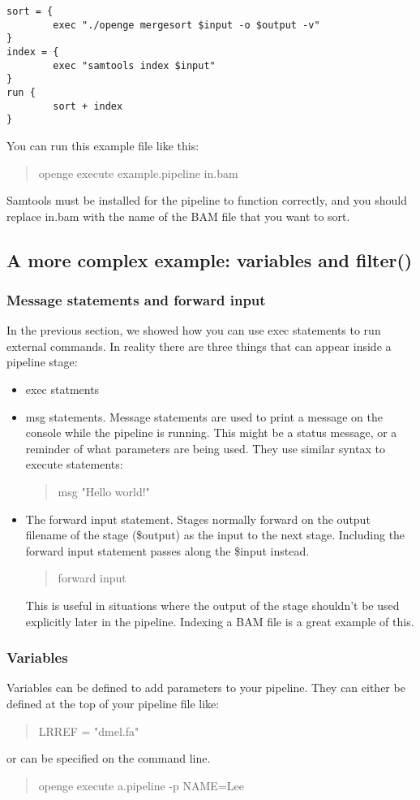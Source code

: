 \documentclass[11pt]{article}
\newcommand {\cmd}[1] {\begin{quote}#1\end{quote}}
\begin{document}
\begin{verbatim}
sort = {
        exec "./openge mergesort $input -o $output -v"
}
index = {
        exec "samtools index $input"
}
run {
        sort + index
}
\end{verbatim}

You can run this example file like this:

\cmd{openge execute example.pipeline in.bam}

Samtools must be installed for the pipeline to function correctly, and you should replace in.bam with the name of the BAM file that you want to sort.

\subsection {A more complex example: variables and filter()}

\subsubsection{Message statements and forward input}
In the previous section, we showed how you can use exec statements to run external commands. In reality there are three things that can appear inside a pipeline stage:
\begin{itemize}
\item exec statments
\item msg statements. Message statements are used to print a message on the console while the pipeline is running. This might be a status message, or a reminder of what parameters are being used.  They use similar syntax to execute statements:
\cmd{msg "Hello world!"}
\item The forward input statement. Stages normally forward on the output filename of the stage (\$output) as  the input to the next stage. Including the forward input statement passes along the \$input instead.
\cmd{forward input}
This is useful in situations where the output of the stage shouldn't be used explicitly later in the pipeline. Indexing a BAM file is a great example of this.
\end{itemize}

\subsubsection{Variables}
Variables can be defined to add parameters to your pipeline. They can either be defined at the top of your pipeline file like:
\cmd{LRREF = "dmel.fa"}
or can be specified on the command line.
\cmd{openge execute a.pipeline -p NAME=Lee}
\end{document}
